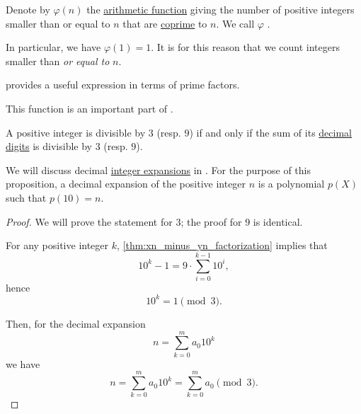 \begin{definition}\label{def:eulers_totient_function}
  Denote by \( \varphi(n) \) the \hyperref[def:arithmetic_function]{arithmetic function} giving the number of positive integers smaller than or equal to \( n \) that are \hyperref[def:coprime_elements]{coprime} to \( n \). We call \( \varphi \) .
\end{definition}
\begin{comments}
  \item In particular, we have \( \varphi(1) = 1 \). It is for this reason that we count integers smaller than \emph{or equal to} \( n \).

  \item {} provides a useful expression in terms of prime factors.

  \item This function is an important part of .
\end{comments}

\begin{proposition}\label{thm:division_by_three_digits}
  A positive integer is divisible by \( 3 \) (resp. \( 9 \)) if and only if the sum of its \hyperref[def:positional_number_system/decimal]{decimal digits} is divisible by \( 3 \) (resp. \( 9 \)).
\end{proposition}
\begin{comments}
  \item We will discuss decimal \hyperref[def:integer_radix_expansion]{integer expansions} in . For the purpose of this proposition, a decimal expansion of the positive integer \( n \) is a polynomial \( p(X) \) such that \( p(10) = n \).
\end{comments}
\begin{proof}
  We will prove the statement for \( 3 \); the proof for \( 9 \) is identical.

  For any positive integer \( k \), \cref{thm:xn_minus_yn_factorization} implies that
  \begin{equation*}
    10^k - 1 = 9 \cdot \sum_{i=0}^{k-1} 10^i,
  \end{equation*}
  hence
  \begin{equation*}
    10^k = 1 \pmod 3.
  \end{equation*}

  Then, for the decimal expansion
  \begin{equation*}
    n = \sum_{k=0}^m a_0 10^k
  \end{equation*}
  we have
  \begin{equation*}
    n = \sum_{k=0}^m a_0 10^k = \sum_{k=0}^m a_0 \pmod 3.
  \end{equation*}
\end{proof}

